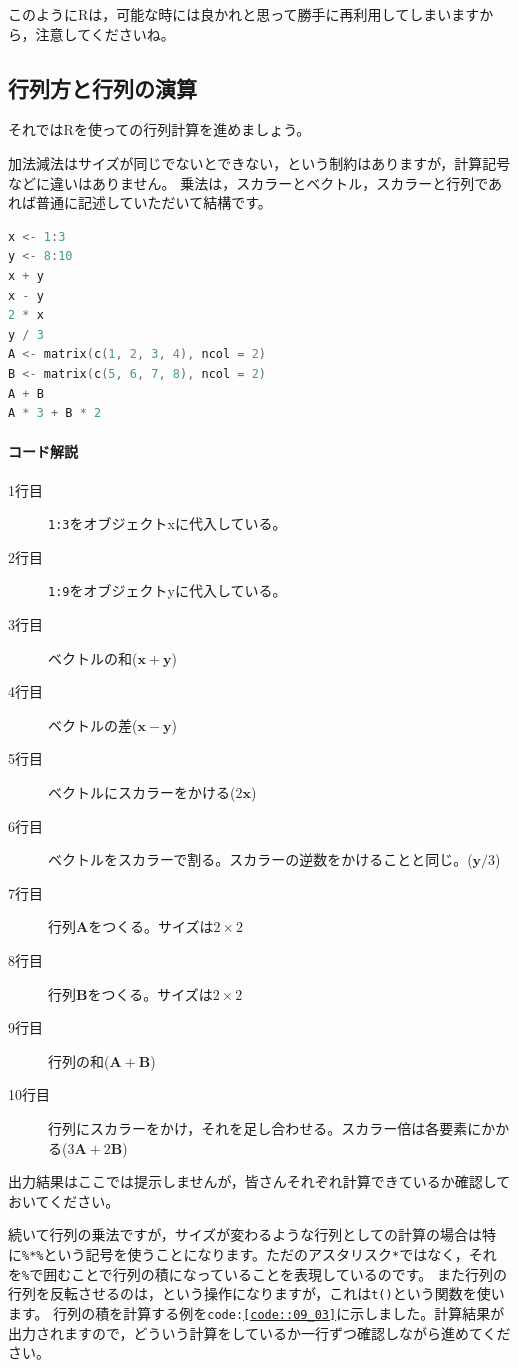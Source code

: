 \documentclass{ltjsbook}
\begin{document}
このようにRは，可能な時には良かれと思って勝手に再利用してしまいますから，注意してくださいね。
\subsection{行列方と行列の演算}
それではRを使っての行列計算を進めましょう。

加法減法はサイズが同じでないとできない，という制約はありますが，計算記号などに違いはありません。
乗法は，スカラーとベクトル，スカラーと行列であれば普通に記述していただいて結構です。

\begin{lstlisting}[language=c++,label={code::09_02},caption={ベクトルの和・差，スカラーをかける}]
x <- 1:3
y <- 8:10
x + y
x - y
2 * x
y / 3
A <- matrix(c(1, 2, 3, 4), ncol = 2)
B <- matrix(c(5, 6, 7, 8), ncol = 2)
A + B
A * 3 + B * 2
\end{lstlisting}
\paragraph{コード解説}
\begin{description}
    \item[1行目] \texttt{1:3}をオブジェクトxに代入している。
    \item[2行目] \texttt{1:9}をオブジェクトyに代入している。
    \item[3行目] ベクトルの和($\bm{x}+\bm{y}$)
    \item[4行目] ベクトルの差($\bm{x}-\bm{y}$)
    \item[5行目] ベクトルにスカラーをかける($2\bm{x}$)
    \item[6行目] ベクトルをスカラーで割る。スカラーの逆数をかけることと同じ。($\bm{y}/3$)
    \item[7行目] 行列$\bm{A}$をつくる。サイズは$2 \times 2$
    \item[8行目] 行列$\bm{B}$をつくる。サイズは$2 \times 2$
    \item[9行目] 行列の和($\bm{A}+\bm{B}$)
    \item[10行目] 行列にスカラーをかけ，それを足し合わせる。スカラー倍は各要素にかかる($3\bm{A}+2\bm{B}$)
\end{description}

出力結果はここでは提示しませんが，皆さんそれぞれ計算できているか確認しておいてください。

続いて行列の乗法ですが，サイズが変わるような行列としての計算の場合は特に\verb|%*%|という記号を使うことになります。ただのアスタリスク\verb|*|ではなく，それを\verb|%|で囲むことで行列の積になっていることを表現しているのです。
また行列の行列を反転させるのは，という操作になりますが，これは\texttt{t()}という関数を使います。
行列の積を計算する例を\texttt{code:\ref{code::09_03}}に示しました。計算結果が出力されますので，どういう計算をしているか一行ずつ確認しながら進めてください。
\end{document}
